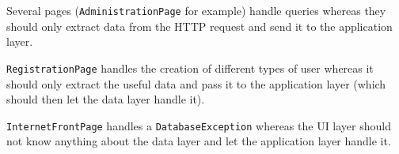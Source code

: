 Several pages (\texttt{AdministrationPage} for example) handle queries whereas they should only extract data from the HTTP request and send it to the application layer.

\texttt{RegistrationPage} handles the creation of different types of user whereas it should only extract the useful data and pass it to the application layer (which should then let the data layer handle it).

\texttt{InternetFrontPage} handles a \texttt{DatabaseException} whereas the UI layer should not know anything about the data layer and let the application layer handle it.


